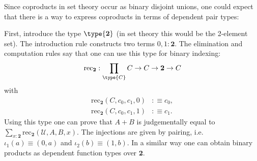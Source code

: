 
    Since coproducts in set theory occur as binary disjoint unions, one could expect that there is a way to express coproducts in terms of dependent pair types:
    \begin{construct}
        First, introduce the type $\type{\mathbf{2}}$ (in set theory this would be the 2-element set). The introduction rule constructs two terms $0,1:\mathbf{2}$. The elimination and computation rules say that one can use this type for binary indexing:
        \begin{gather}
            \mathrm{rec}_{\mathbf{2}}:\prod_{\type{C}}C\rightarrow C\rightarrow\mathbf{2}\rightarrow C
        \end{gather}
        with
        \begin{align}
            \mathrm{rec}_{\mathbf{2}}(C, c_0, c_1, 0)&:\equiv c_0,\\
            \mathrm{rec}_{\mathbf{2}}(C, c_0, c_1, 1)&:\equiv c_1.
        \end{align}
        Using this type one can prove that $A+B$ is judgementally equal to $\sum_{x:\mathbf{2}}\mathrm{rec}_{\mathbf{2}}(\mathcal{U},A,B,x)$. The injections are given by pairing, i.e.~$\iota_1(a)\equiv(0,a)$ and $\iota_2(b)\equiv(1,b)$. In a similar way one can obtain binary products as dependent function types over $\mathbf{2}$.
    \end{construct}

